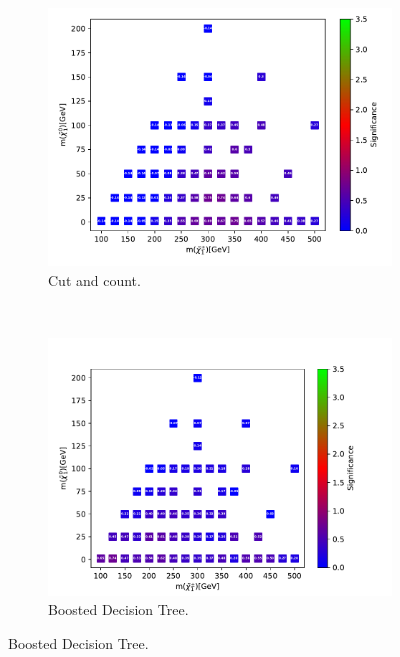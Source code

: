 \begin{figure}[H]
    \centering
    \begin{subfigure}[t!]{0.49\textwidth}
    \includegraphics[width = \textwidth]{Figures/Significances/significanceCutandCount_WW_all.pdf}
    \caption{Cut and count.}
        \label{fig:signLowWWcandc}
    \end{subfigure}
    \\
    \begin{subfigure}[t!]{0.49\textwidth}
    \includegraphics[width = \textwidth]{Figures/Significances/significance_BDT_WW_Low_level.pdf}
    \caption{Boosted Decision Tree.}
        \label{fig:signLowWWBDT}
    \end{subfigure}      

\end{figure}
